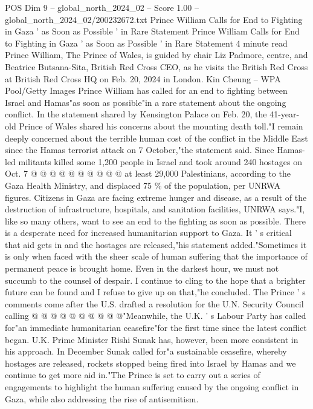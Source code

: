 \begin{textsample}{POS Dim 9 – global\_north\_2024\_02 – Score 1.00 – global\_north\_2024\_02/200232672.txt}  \label{ex:f9_pos_217}
Prince William Calls for End to Fighting in Gaza ' as Soon as Possible ' in Rare Statement Prince William Calls for End to Fighting in Gaza ' as Soon as Possible ' in Rare Statement 4 minute read Prince William, The Prince of Wales, is guided by chair Liz Padmore, centre, and Beatrice Butsana-Sita, British Red Cross CEO, as he visits the British Red Cross at British Red Cross HQ on Feb. 20, 2024 in London.
Kin Cheung -- WPA Pool/Getty Images Prince William has called for an end to fighting between Israel and Hamas"as soon as possible"in a rare statement about the ongoing conflict.
In the statement shared by Kensington Palace on Feb. 20, the 41-year-old Prince of Wales shared his concerns about the mounting death toll."I remain deeply concerned about the terrible human cost of the conflict in the Middle East since the Hamas terrorist attack on 7 October,"the statement said.
Since Hamas-led militants killed some 1,200 people in Israel and took around 240 hostages on Oct. 7 @ @ @ @ @ @ @ @ @ @ at least 29,000 Palestinians, according to the Gaza Health Ministry, and displaced 75 \% of the population, per UNRWA figures.
Citizens in Gaza are facing extreme hunger and disease, as a result of the destruction of infrastructure, hospitals, and sanitation facilities, UNRWA says."I, like so many others, want to see an end to the fighting as soon as possible.
There is a desperate need for increased humanitarian support to Gaza.
It ' s critical that aid gets in and the hostages are released,"his statement added."Sometimes it is only when faced with the sheer scale of human suffering that the importance of permanent peace is brought home.
Even in the darkest hour, we must not succumb to the counsel of despair.
I continue to cling to the hope that a brighter future can be found and I refuse to give up on that,"he concluded.
The Prince ' s comments come after the U.S. drafted a resolution for the U.N.
Security Council calling @ @ @ @ @ @ @ @ @ @"Meanwhile, the U.K. ' s Labour Party has called for"an immediate humanitarian ceasefire"for the first time since the latest conflict began.
U.K.
Prime Minister Rishi Sunak has, however, been more consistent in his approach.
In December Sunak called for"a sustainable ceasefire, whereby hostages are released, rockets stopped being fired into Israel by Hamas and we continue to get more aid in."The Prince is set to carry out a series of engagements to highlight the human suffering caused by the ongoing conflict in Gaza, while also addressing the rise of antisemitism.

\end{textsample}
